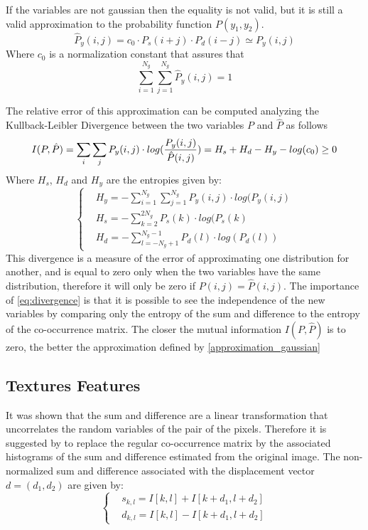 If the variables are not gaussian then the equality is not valid, but it is still a valid approximation to the probability function $P(y_1, y_2)$. 
\begin{equation}
    \hat{P}_y(i,j) = c_0\cdot P_s(i+j) \cdot P_d(i-j) \simeq P_y(i,j)
    \label{approximation_gaussian}
\end{equation}{}
Where $c_0$ is a normalization constant that assures that
\begin{equation}
    \sum_{i=1}^{N_g}\sum_{j=1}^{N_g} \hat{P}_y(i,j) = 1
\end{equation}{}

The relative error of this approximation can be computed analyzing the Kullback-Leibler Divergence between the two variables $P$ and $\hat{P}$ as follows
\begin{equation}
\label{eq:divergence}
    I(P, \hat{P}) = \sum_i\sum_j P_y(i,j)\cdot log(\frac{P_y(i,j)}{\hat{P}(i,j)}) = \\
    H_s + H_d - H_y -log(c_0)\geq0
\end{equation}{}
Where $H_s$, $H_d$ and $H_y$ are the entropies given by:
\begin{equation}
\begin{cases}
&H_y = -\sum_{i=1}^{N_g}\sum_{j=1}^{N_g}P_y(i,j)\cdot log(P_y(i,j)\\
&H_s = -\sum_{k=2}^{2N_g}P_s(k)\cdot log(P_s(k)\\
&H_d = -\sum_{l=-N_g+1}^{N_g-1}P_d(l)\cdot log(P_d(l))
\end{cases}
\end{equation}
This divergence is a measure of the error of approximating one distribution for another, and is equal to zero only when the two variables have the same distribution, therefore it will only be zero if $P(i,j)=\hat{P}(i,j)$. The importance of \ref{eq:divergence} is that it is possible to see the independence of the new variables by comparing only the entropy of the sum and difference to the entropy of the co-occurrence matrix. The closer the mutual information $I(P, \hat{P})$ is to zero, the better the approximation defined by \ref{approximation_gaussian}

\subsection{Textures Features}
It was shown that the sum and difference are a linear transformation that uncorrelates the random variables of the pair of the pixels. Therefore it is suggested by \cite{Unser} to replace the regular co-occurrence matrix by the associated histograms of the sum and difference estimated from the original image.
The non-normalized sum and difference associated with the displacement vector $d=(d_1,d_2)$ are given by:
\begin{equation}
\begin{cases}
&s_{k,l} = I[k,l] + I[k+d_1, l+d_2]\\
&d_{k,l} = I[k,l] - I[k+d_1, l+d_2]
\end{cases}
\end{equation}

